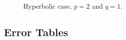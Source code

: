 \newpage

\vspace*{\fill}
\begin{figure}[!ht]
    \centering
    \begin{subfigure}[t]{0.49\textwidth}
        \centering
        
    \end{subfigure}
    \par\medskip
    \begin{subfigure}[t]{0.49\textwidth}
        \centering
        
    \end{subfigure}
    \hfill
    \begin{subfigure}[t]{0.49\textwidth}
        \centering
        
    \end{subfigure}
    \caption{Hyperbolic case, $p = 2$ and $q = 1$.}
\end{figure}
\vspace*{\fill}

\newpage
\subsection{Error Tables}

